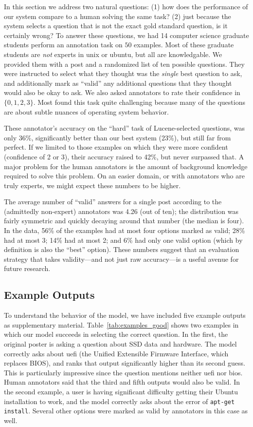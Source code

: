 \documentclass[11pt]{report}
\begin{document}
In this section we address two natural questions:
(1) how does the performance of our system compare to a human solving the same task?
(2) just because the system selects a question that is not the exact gold standard question, is it certainly wrong?
To answer these questions, we had 14 computer science graduate students perform an annotation task on $50$ examples.
Most of these graduate students are \emph{not} experts in unix or ubuntu, but all are knowledgable.
We provided them with a post and a randomized list of ten possible questions.
They were instructed to select what they thought was the \emph{single} best question to ask, and additionally mark as ``valid'' any additional questions that they thought would also be okay to ask.
We also asked annotators to rate their confidence in $\{0,1,2,3\}$.
Most found this task quite challenging because many of the questions are about subtle nuances of operating system behavior.

These annotator's accuracy on the ``hard'' task of Lucene-selected questions, was only 36\%, significantly better than our best system (23\%), but still far from perfect.
If we limited to those examples on which they were more confident (confidence of 2 or 3), their accuracy raised to 42\%, but never surpassed that.
A major problem for the human annotators is the amount of background knowledge required to solve this problem.
On an easier domain, or with annotators who are truly experts, we might expect these numbers to be higher.

The average number of ``valid'' answers for a single post according to the (admittedly non-expert) annotators was 4.26 (out of ten); the distribution was fairly symmetric and quickly decaying around that number (the median is four).
In the data, 56\% of the examples had at most four options marked as valid; 
28\% had at most 3; 14\% had at most 2; and 6\% had only one valid option (which by definition is also the ``best'' option).
These numbers suggest that an evaluation strategy that takes validity---and not just raw accuracy---is a useful avenue for future research.

\subsection{Example Outputs}

To understand the behavior of the model, we have included five example outputs as supplementary material.
Table~\ref{tab:examples_good} shows two examples in which our model succeeds in selecting the correct question.
In the first, the original poster is asking a question about SSD data and hardware.
The model correctly asks about uefi (the Unified Extensible Firmware Interface, which replaces BIOS), and ranks that output significantly higher than its second guess.
This is particularly impressive since the question mentions neither uefi nor bios. Human annotators said that the third and fifth outputs would also be valid. In the second example, a user is having significant difficulty getting their Ubuntu installation to work, and the model correctly asks about the error of \texttt{\small apt-get install}.
Several other options were marked as valid by annotators in this case as well.
\end{document}

